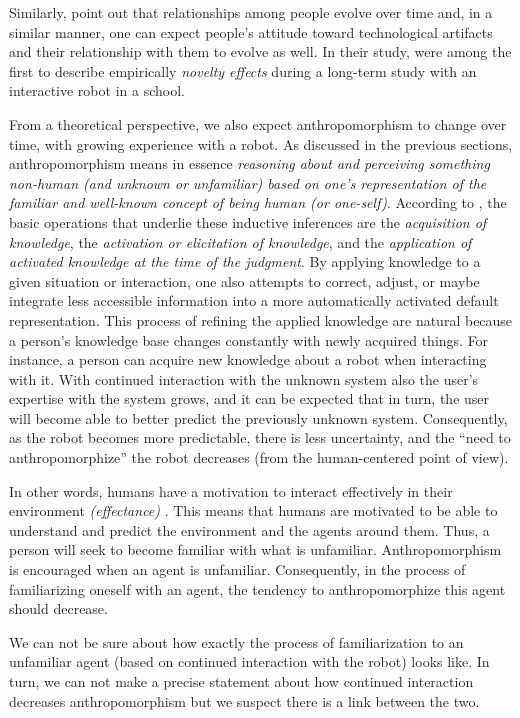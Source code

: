 \documentclass{frontiersSCNS} %
\begin{document}
Similarly, \citet{kanda_interactive_2004} point out that relationships among
people evolve over time and, in a similar manner, one can expect people's
attitude toward technological artifacts and their relationship with them to
evolve as well.  In their study, \citet{kanda_interactive_2004} were among the
first to describe empirically \emph{novelty effects} during a long-term study
with an interactive robot in a school.

From a theoretical perspective, we also expect anthropomorphism to change over
time, with growing experience with a robot. As discussed in the previous
sections, anthropomorphism means in essence \emph{reasoning about and perceiving
    something non-human (and unknown or unfamiliar) based on one's
representation of the familiar and well-known concept of being human (or
one-self)}. According to \citet{epley_when_2008}, the basic operations that
underlie these inductive inferences are the \emph{acquisition of knowledge}, the
\emph{activation or elicitation of knowledge}, and the \emph{application of
activated knowledge at the time of the judgment}. By applying knowledge to a
given situation or interaction, one also attempts to correct, adjust, or maybe
integrate less accessible information into a more automatically activated
default representation.  This process of refining the applied knowledge are
natural because a person's knowledge base changes constantly with newly acquired
things. For instance, a person can acquire new knowledge about a robot when
interacting with it. With continued interaction with the unknown system also the
user's expertise with the system grows, and it can be expected that in turn, the
user will become able to better predict the previously unknown system.
Consequently, as the robot becomes more predictable, there is less uncertainty,
and the ``need to anthropomorphize'' the robot decreases (from the
human-centered point of view).

In other words, humans have a motivation to interact effectively in their
environment \textit{(effectance)} \citep{epley_when_2008}.  This means that
humans are motivated to be able to understand and predict the environment and
the agents around them. Thus, a person will seek to become familiar with what is
unfamiliar. Anthropomorphism is encouraged when an agent is unfamiliar.
Consequently, in the process of familiarizing oneself with an agent, the
tendency to anthropomorphize this agent should decrease.

We can not be sure about how exactly the process of familiarization to an
unfamiliar agent (based on continued interaction with the robot) looks like. In
turn, we can not make a precise statement about how continued interaction
decreases anthropomorphism but we suspect there is a link between the two.
\end{document}
